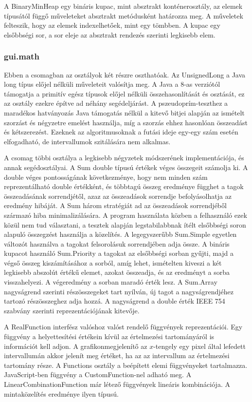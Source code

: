 A BinaryMinHeap egy bináris kupac, mint absztrakt konténerosztály, az elemek típusától függő műveleteket absztrakt metódusként határozza meg.
A műveletek felteszik, hogy az elemek indexelhetőek, mint egy tömbben.
A kupac egy elsőbbségi sor, a sor eleje az absztrakt rendezés szerinti legkisebb elem.

\subsubsection{gui.math}

Ebben a csomagban az osztályok két részre oszthatóak.
Az UnsignedLong a Java long típus előjel nélküli műveleteit valósítja meg.
A Java a 8-as verziótól támogatja a primitív egész típusok előjel nélküli összehasonlítását és osztását, ez az osztály ezekre építve ad néhány segédeljárást.
A pszeudoprím-teszthez a maradékos hatványozás Java támogatás nélkül a kitevő bitjei alapján az ismételt szorzást és négyzetre emelést használja, míg a szorzás ehhez hasonlóan összeadást és kétszerezést. Ezeknek az algoritmusoknak a futási ideje egy-egy szám esetén elfogadható, de intervallumok szitálására nem alkalmas.

A csomag többi osztálya a legkisebb négyzetek módszerének implementációja, és annak segédosztályai.
A Sum double típusú értékek véges összegeit számolja ki.
A double véges pontosságának következménye, hogy nem minden szám reprezentálható double értékként, és többtagú összeg eredménye függhet a tagok összeadásának sorrendjétől, azaz az összeadások sorrendje befolyásolhatja az eredmény hibáját.
A Sum három stratégiát ad az összeadások sorrendjéből származó hiba minimalizálására.
A program használata közben a felhasználó ezek közül nem tud választani, a tesztek alapján legstabilabbnak ítélt elsőbbségi soron alapuló összegzést használja a közelítés.
A legegyszerűbb Sum.Simple egyetlen változót használva a tagokat felsorolásuk sorrendjében adja össze.
A bináris kupacot használó Sum.Priority a tagokat az elsőbbségi sorban gyűjti, majd a végső összeg kiszámításához a sorból, amíg lehet, ismételten kiveszi a két legkisebb abszolút értékű elemet, azokat összeadja, és az eredményt a sorba visszahelyezi. A végeredmény a sorban maradó érték lesz.
A Sum.Array nagyságrend szerinti részösszegeket tart nyílván, új tagot a nagyságrendjéhez tartozó részösszeghez adja hozzá.
A nagyságrend a double érték IEEE 754 szabvány szerinti reprezentációjának kitevője.

A RealFunction interfész valóshoz valóst rendelő függvények reprezentációi.
Egy függvény a helyettesítési értékein kívül az értelmezési tartományáról is információt kell adjon.
A grafikonmegjelenítő az $x$-tengely egy pixel által lefedett intervallumán akkor jelenít meg értéket, ha az az intervallum az értelmezési tartomány része.
A Functions osztály a beépített elemi függvényeket tartalmazza.
JavaScript-ben függvény a CustomFunction-nel adható meg.
A LinearCombinationFunction már létező függvények lineáris kombinációja.
A mintaközelítés eredménye ilyen típusú.

